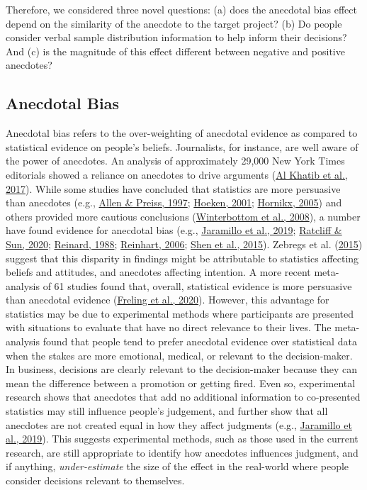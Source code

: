 \documentclass[
  man, donotrepeattitle,floatsintext]{apa7}
\theoremstyle{definition}
\theoremstyle{definition}
\theoremstyle{definition}
\theoremstyle{definition}
\theoremstyle{remark}
\begin{document}
Therefore, we considered three novel questions: (a) does the anecdotal bias
effect depend on the similarity of the anecdote to the target project? (b) Do
people consider verbal sample distribution information to help inform their
decisions? And (c) is the magnitude of this effect different between negative
and positive anecdotes?

\hypertarget{anecdotal-bias}{%
\subsection{Anecdotal Bias}\label{anecdotal-bias}}

Anecdotal bias refers to the over-weighting of anecdotal evidence as compared to
statistical evidence on people's beliefs. Journalists, for instance, are well
aware of the power of anecdotes. An analysis of approximately 29,000 New York
Times editorials showed a reliance on anecdotes to drive arguments
(\protect\hyperlink{ref-alkhatib2017}{Al Khatib et al., 2017}). While some studies have concluded that statistics are more
persuasive than anecdotes (e.g., \protect\hyperlink{ref-allen1997}{Allen \& Preiss, 1997}; \protect\hyperlink{ref-hoeken2001}{Hoeken, 2001}; \protect\hyperlink{ref-hornikx2005}{Hornikx, 2005}) and
others provided more cautious conclusions (\protect\hyperlink{ref-winterbottom2008}{Winterbottom et al., 2008}), a number have
found evidence for anecdotal bias (e.g., \protect\hyperlink{ref-jaramillo2019}{Jaramillo et al., 2019}; \protect\hyperlink{ref-ratcliff2020}{Ratcliff \& Sun, 2020}; \protect\hyperlink{ref-reinard1988}{Reinard, 1988}; \protect\hyperlink{ref-reinhart2006}{Reinhart, 2006}; \protect\hyperlink{ref-shen2015}{Shen et al., 2015}). Zebregs et al. (\protect\hyperlink{ref-zebregs2015}{2015}) suggest that this
disparity in findings might be attributable to statistics affecting beliefs and
attitudes, and anecdotes affecting intention. A more recent meta-analysis of 61
studies found that, overall, statistical evidence is more persuasive than
anecdotal evidence (\protect\hyperlink{ref-freling2020}{Freling et al., 2020}). However, this advantage for statistics may be
due to experimental methods where participants are presented with situations to
evaluate that have no direct relevance to their lives. The meta-analysis found
that people tend to prefer anecdotal evidence over statistical data when the
stakes are more emotional, medical, or relevant to the decision-maker. In
business, decisions are clearly relevant to the decision-maker because they can
mean the difference between a promotion or getting fired. Even so, experimental
research shows that anecdotes that add no additional information to co-presented
statistics may still influence people's judgement, and further show that all
anecdotes are not created equal in how they affect judgments (e.g., \protect\hyperlink{ref-jaramillo2019}{Jaramillo et al., 2019}). This suggests experimental methods, such as those used in the
current research, are still appropriate to identify how anecdotes influences
judgment, and if anything, \emph{under-estimate} the size of the effect in the
real-world where people consider decisions relevant to themselves.
\end{document}
